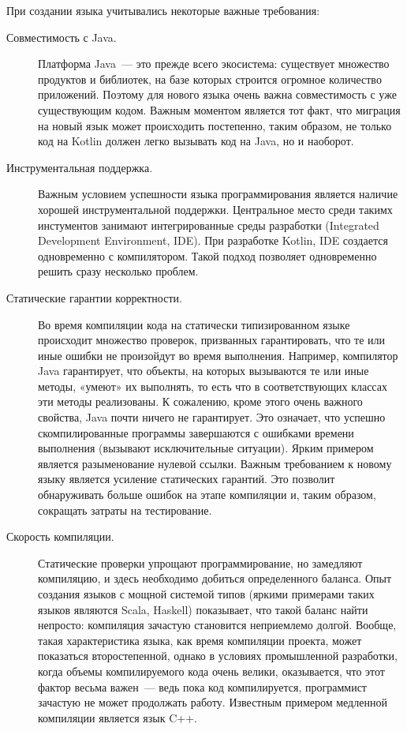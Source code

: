 При создании языка учитывались некоторые важные требования: %
\begin{description}
	\item[Совместимость с Java.] Платформа Java~--- это прежде всего экосистема: существует множество продуктов и библиотек, на базе которых строится огромное количество приложений. 
	Поэтому для нового языка очень важна совместимость с уже существующим кодом. Важным моментом является тот факт, что миграция на новый язык может происходить постепенно, таким образом, не только код на Kotlin должен легко вызывать код на Java, но и наоборот.

	\item[Инструментальная поддержка.] Важным условием успешности языка программирования является наличие хорошей инструментальной поддержки. Центральное место среди такимх инстументов занимают интегрированные среды разработки (Integrated Development Environment, IDE). 
	При разработке Kotlin, IDE создается одновременно с компилятором. Такой подход позволяет одновременно решить сразу несколько проблем. \td

	\item[Статические гарантии корректности.] Во время компиляции кода на статически типизированном языке происходит множество проверок, призванных гарантировать, что те или иные ошибки не произойдут во время выполнения. Например, компилятор Java гарантирует, что объекты, на которых вызываются те или иные методы, «умеют» их выполнять, то есть что в соответствующих классах эти методы реализованы. К сожалению, кроме этого очень важного свойства, Java почти ничего не гарантирует. Это означает, что успешно скомпилированные программы завершаются с ошибками времени выполнения (вызывают исключительные ситуации). Ярким примером является разыменование нулевой ссылки. Важным требованием к новому языку является усиление статических гарантий. Это позволит обнаруживать больше ошибок на этапе компиляции и, таким образом, сокращать затраты на тестирование.

	\item[Скорость компиляции.] Статические проверки упрощают программирование, но замедляют компиляцию, и здесь необходимо добиться определенного баланса. Опыт создания языков с мощной системой типов (яркими примерами таких языков являются Scala, Haskell) показывает, что такой баланс найти непросто: компиляция зачастую становится неприемлемо долгой.
	Вообще, такая характеристика языка, как время компиляции проекта, может показаться второстепенной, однако в условиях промышленной разработки, когда объемы компилируемого кода очень велики, оказывается, что этот фактор весьма важен~--- ведь пока код компилируется, программист зачастую не может продолжать работу. Известным примером медленной компиляции является язык C++.


\end{description}
